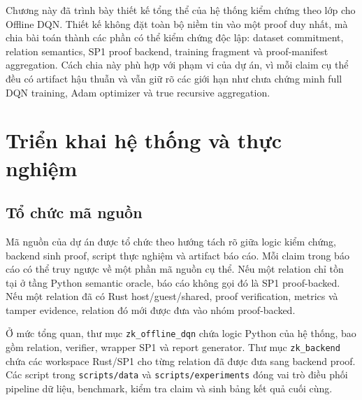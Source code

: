 \documentclass[12pt,a4paper,oneside]{report}
\newcommand{\code}[1]{\texttt{#1}}
\begin{document}
Chương này đã trình bày thiết kế tổng thể của hệ thống kiểm chứng theo lớp cho Offline DQN. Thiết kế không đặt toàn bộ niềm tin vào một proof duy nhất, mà chia bài toán thành các phần có thể kiểm chứng độc lập: dataset commitment, relation semantics, SP1 proof backend, training fragment và proof-manifest aggregation. Cách chia này phù hợp với phạm vi của dự án, vì mỗi claim cụ thể đều có artifact hậu thuẫn và vẫn giữ rõ các giới hạn như chưa chứng minh full DQN training, Adam optimizer và true recursive aggregation.

\chapter{Triển khai hệ thống và thực nghiệm}

\section{Tổ chức mã nguồn}

Mã nguồn của dự án được tổ chức theo hướng tách rõ giữa logic kiểm chứng, backend sinh proof, script thực nghiệm và artifact báo cáo. Mỗi claim trong báo cáo có thể truy ngược về một phần mã nguồn cụ thể. Nếu một relation chỉ tồn tại ở tầng Python semantic oracle, báo cáo không gọi đó là SP1 proof-backed. Nếu một relation đã có Rust host/guest/shared, proof verification, metrics và tamper evidence, relation đó mới được đưa vào nhóm proof-backed.

Ở mức tổng quan, thư mục \code{zk\_offline\_dqn} chứa logic Python của hệ thống, bao gồm relation, verifier, wrapper SP1 và report generator. Thư mục \code{zk\_backend} chứa các workspace Rust/SP1 cho từng relation đã được đưa sang backend proof. Các script trong \code{scripts/data} và \code{scripts/experiments} đóng vai trò điều phối pipeline dữ liệu, benchmark, kiểm tra claim và sinh bảng kết quả cuối cùng.
\end{document}

